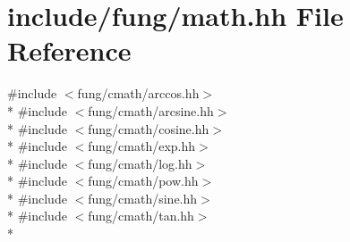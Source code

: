 \hypertarget{math_8hh}{\section{include/fung/math.hh File Reference}
\label{math_8hh}
}
{\ttfamily \#include $<$fung/cmath/arccos.\-hh$>$}\\*
{\ttfamily \#include $<$fung/cmath/arcsine.\-hh$>$}\\*
{\ttfamily \#include $<$fung/cmath/cosine.\-hh$>$}\\*
{\ttfamily \#include $<$fung/cmath/exp.\-hh$>$}\\*
{\ttfamily \#include $<$fung/cmath/log.\-hh$>$}\\*
{\ttfamily \#include $<$fung/cmath/pow.\-hh$>$}\\*
{\ttfamily \#include $<$fung/cmath/sine.\-hh$>$}\\*
{\ttfamily \#include $<$fung/cmath/tan.\-hh$>$}\\*
